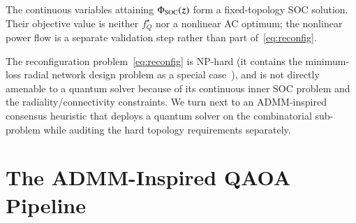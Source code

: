 \documentclass[5p,twocolumn,number,sort&compress,nopreprintline]{elsarticle}
\begin{document}
The continuous variables attaining $\Phi_{\rm SOC}(\boldsymbol z)$
form a fixed-topology SOC solution. Their objective value is neither
$f_Q^\star$ nor a nonlinear AC optimum; the nonlinear power flow is a
separate validation step rather than part of~\eqref{eq:reconfig}.

The reconfiguration problem~\eqref{eq:reconfig} is NP-hard (it
contains the minimum-loss radial network design problem as a special
case~\cite{fisher2008ots}), and is not directly amenable to a
quantum solver because of its continuous inner SOC problem and the
radiality/connectivity constraints. We turn next to an ADMM-inspired
consensus heuristic that deploys a quantum solver on the combinatorial
sub-problem while auditing the hard topology requirements separately.

\section{The ADMM-Inspired QAOA Pipeline}
\label{sec:admm-qaoa}
\end{document}
